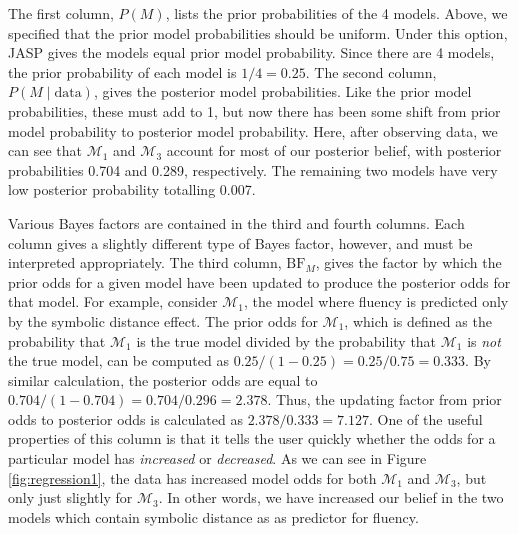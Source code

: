 \documentclass[english,,doc,floatsintext]{apa6}
\begin{document}
The first column, \(P(M)\), lists the prior probabilities of the 4 models. Above, we specified that the prior model probabilities should be uniform. Under this option, JASP gives the models equal prior model probability. Since there are 4 models, the prior probability of each model is \(1/4 = 0.25\). The second column, \(P(M \mid \text{data})\), gives the posterior model probabilities. Like the prior model probabilities, these must add to 1, but now there has been some shift from prior model probability to posterior model probability. Here, after observing data, we can see that \(\mathcal{M}_{1}\) and \(\mathcal{M}_{3}\) account for most of our posterior belief, with posterior probabilities 0.704 and 0.289, respectively. The remaining two models have very low posterior probability totalling 0.007.

Various Bayes factors are contained in the third and fourth columns. Each column gives a slightly different type of Bayes factor, however, and must be interpreted appropriately. The third column, \(\text{BF}_{M}\), gives the factor by which the prior odds for a given model have been updated to produce the posterior odds for that model. For example, consider \(\mathcal{M}_{1}\), the model where fluency is predicted only by the symbolic distance effect. The prior odds for \(\mathcal{M}_{1}\), which is defined as the probability that \(\mathcal{M}_{1}\) is the true model divided by the probability that \(\mathcal{M}_{1}\) is \emph{not} the true model, can be computed as \(0.25/(1-0.25) = 0.25/0.75 = 0.333\). By similar calculation, the posterior odds are equal to \(0.704/(1-0.704) = 0.704/0.296 = 2.378\). Thus, the updating factor from prior odds to posterior odds is calculated as \(2.378/0.333 = 7.127\). One of the useful properties of this column is that it tells the user quickly whether the odds for a particular model has \emph{increased} or \emph{decreased}. As we can see in Figure \ref{fig:regression1}, the data has increased model odds for both \(\mathcal{M}_{1}\) and \(\mathcal{M}_{3}\), but only just slightly for \(\mathcal{M}_{3}\). In other words, we have increased our belief in the two models which contain symbolic distance as as predictor for fluency.
\end{document}

